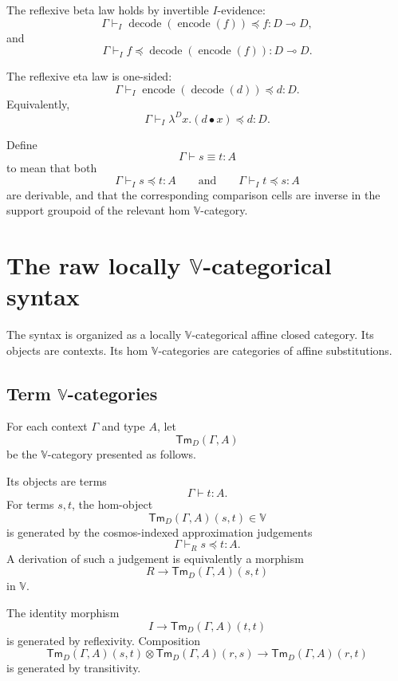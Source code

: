 The reflexive beta law holds by invertible \(I\)-evidence:
\[
    \Gamma
    \vdash_I
    \operatorname{decode}(\operatorname{encode}(f))
    \preceq
    f
    :
    D\multimap D,
\]
and
\[
    \Gamma
    \vdash_I
    f
    \preceq
    \operatorname{decode}(\operatorname{encode}(f))
    :
    D\multimap D.
\]

The reflexive eta law is one-sided:
\[
    \Gamma
    \vdash_I
    \operatorname{encode}(\operatorname{decode}(d))
    \preceq
    d
    :
    D.
\]
Equivalently,
\[
    \Gamma
    \vdash_I
    \lambda^D x.(d\bullet x)
    \preceq
    d
    :
    D.
\]

\begin{definition}
\label{def:definitional-equality-cosmos}
Define
\[
    \Gamma\vdash s\equiv t:A
\]
to mean that both
\[
    \Gamma\vdash_I s\preceq t:A
    \qquad\text{and}\qquad
    \Gamma\vdash_I t\preceq s:A
\]
are derivable, and that the corresponding comparison cells are inverse in the
support groupoid of the relevant hom \(\mathbb V\)-category.
\end{definition}

\section{The raw locally \(\mathbb V\)-categorical syntax}
\label{sec:raw-locally-V-categorical-syntax}

The syntax is organized as a locally \(\mathbb V\)-categorical affine closed
category.  Its objects are contexts.  Its hom \(\mathbb V\)-categories are
categories of affine substitutions.

\subsection{Term \(\mathbb V\)-categories}
\label{subsec:term-V-categories}

For each context \(\Gamma\) and type \(A\), let
\[
    \mathsf{Tm}_D(\Gamma,A)
\]
be the \(\mathbb V\)-category presented as follows.

Its objects are terms
\[
    \Gamma\vdash t:A.
\]
For terms \(s,t\), the hom-object
\[
    \mathsf{Tm}_D(\Gamma,A)(s,t)\in\mathbb V
\]
is generated by the cosmos-indexed approximation judgements
\[
    \Gamma\vdash_R s\preceq t:A.
\]
A derivation of such a judgement is equivalently a morphism
\[
    R\longrightarrow \mathsf{Tm}_D(\Gamma,A)(s,t)
\]
in \(\mathbb V\).

The identity morphism
\[
    I\to \mathsf{Tm}_D(\Gamma,A)(t,t)
\]
is generated by reflexivity.  Composition
\[
    \mathsf{Tm}_D(\Gamma,A)(s,t)
    \otimes
    \mathsf{Tm}_D(\Gamma,A)(r,s)
    \longrightarrow
    \mathsf{Tm}_D(\Gamma,A)(r,t)
\]
is generated by transitivity.

